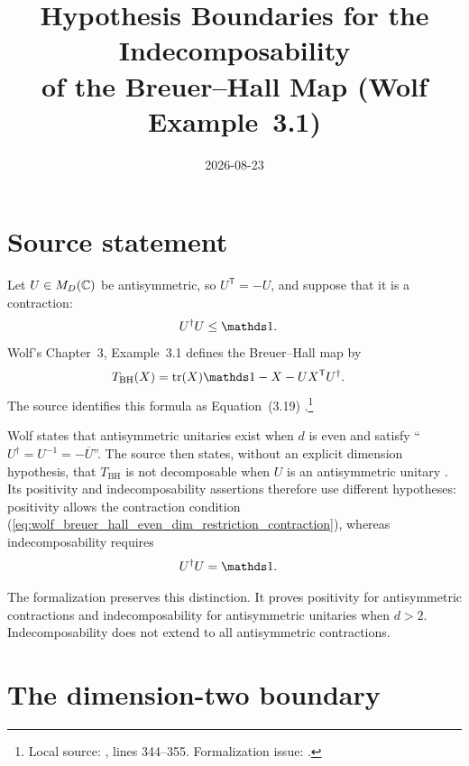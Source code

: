 \documentclass{article}
\title{Hypothesis Boundaries for the Indecomposability\\
of the Breuer--Hall Map (Wolf Example~3.1)}
\author{}
\date{2026-08-23}
\begin{document}
\maketitle
{}

\section{Source statement}

Let $U\in M_D(\mathbb{C})$ be antisymmetric, so $U^{\mathsf T}=-U$, and suppose that it is
a contraction:
\begin{align}
    U^\dagger U
        &\leq\Id.
    \label{eq:wolf_breuer_hall_even_dim_restriction_contraction}
\end{align}
Wolf's Chapter~3, Example~3.1 defines the Breuer--Hall map by
\begin{align}
    T_{\mathrm{BH}}(X)
        &=\tr(X)\Id-X-UX^{\mathsf T}U^\dagger.
    \label{eq:wolf_breuer_hall_even_dim_restriction_breuer_hall_map}
\end{align}
The source identifies this formula as Equation~(3.19)
\cite[Chapter~3, Example~3.1]{Wolf2012Quantum}.\footnote{Local source:
, lines
344--355. Formalization issue: .}

Wolf states that antisymmetric unitaries exist when $d$ is even and satisfy
``$U^\dagger=U^{-1}=-\overline U$''. The source then states, without an
explicit dimension hypothesis, that $T_{\mathrm{BH}}$ is not decomposable
when $U$ is an antisymmetric unitary \cite[Example~3.1]{Wolf2012Quantum}.
Its positivity and indecomposability assertions therefore use different
hypotheses: positivity allows the contraction condition
(\ref{eq:wolf_breuer_hall_even_dim_restriction_contraction}), whereas
indecomposability requires
\begin{align}
    U^\dagger U
        &=\Id.
    \label{eq:wolf_breuer_hall_even_dim_restriction_unitarity}
\end{align}

The formalization preserves this distinction. It proves positivity for
antisymmetric contractions and indecomposability for antisymmetric unitaries
when $d>2$. Indecomposability does not extend to all antisymmetric
contractions.

\section{The dimension-two boundary}
\end{document}
